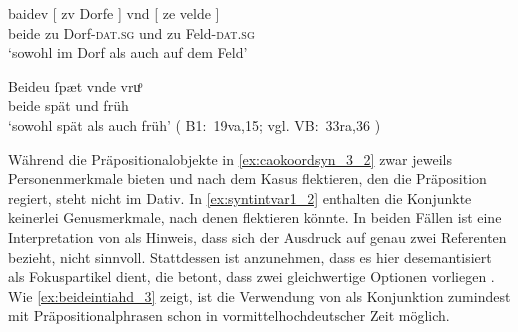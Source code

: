 \begin{exe}
\ex \label{ex:beidquantsyncont}
	\begin{xlist}
	\ex \label{ex:caokoordsyn_3_2}
		\gll baidev \textup{[} zv Dorfe \textup{]} vnd
				\textup{[} ze velde \textup{]} \\
			beide {} zu Dorf-\textsc{dat.sg} {} und {} zu Feld-\textsc{dat.sg} {} \\
		\trans `sowohl im Dorf als auch auf dem Feld'
			\parencites(Nr.~3319, Michelstetten, Bz.~Mistelbach, 1299)[461,28]{cao4}

		\medskip

	\ex \label{ex:syntintvar1_2}
		\gll Beideu {\ob} ſpæt {\cb} vnde
			{\ob} vruͦ {\cb} \\
			beide {} spät {} und {} früh {} \\
		\trans `sowohl spät als auch früh'
			(%
				B1:~19va,15; vgl.
				VB:~33ra,36%
			)

	\end{xlist}
\end{exe}

Während die Präpositionalobjekte in \cref{ex:caokoordsyn_3_2} zwar jeweils
Personenmerkmale bieten und nach dem Kasus flektieren, den die Präposition
regiert, steht  nicht im Dativ.
In \cref{ex:syntintvar1_2} enthalten die Konjunkte keinerlei Genusmerkmale,
nach denen  flektieren könnte. In beiden Fällen ist eine
Interpretation von  als Hinweis, dass sich der Ausdruck auf genau
zwei Referenten bezieht, nicht sinnvoll. Stattdessen ist anzunehmen, dass es
hier desemantisiert als Fokuspartikel dient, die betont, dass zwei
gleichwertige Optionen vorliegen \autocite[425--428]{johannessen2005}. Wie
\cref{ex:beideintiahd_3} zeigt, ist die Verwendung von  als
Konjunktion zumindest mit Präpositionalphrasen schon in vormittelhochdeutscher
Zeit möglich.

